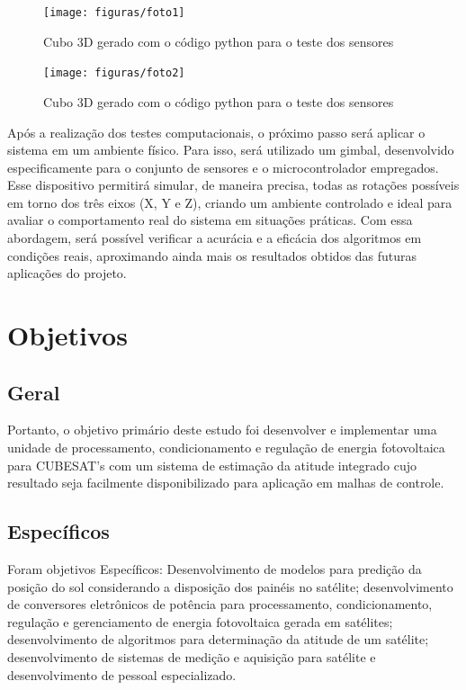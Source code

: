 \documentclass[
	12pt,				%
	openright,			%
	oneside,			%
	a4paper,			%
	english,			%
	brazil				%
	]{abntex2}
\begin{document}
\begin{figure}[h]
	\centering
	\texttt{[image: figuras/foto1]}
	\caption{Cubo 3D gerado com o código python para o teste dos sensores}
	\label{fig:Imagemcubo1}
\end{figure}

\begin{figure}[h]
	\centering
	\texttt{[image: figuras/foto2]}
	\caption{Cubo 3D gerado com o código python para o teste dos sensores}
	\label{fig:Imagemcubo2}
\end{figure}


Após a realização dos testes computacionais, o próximo passo será aplicar o sistema em um ambiente físico. Para isso, será utilizado um gimbal, desenvolvido especificamente para o conjunto de sensores e o microcontrolador empregados. Esse dispositivo permitirá simular, de maneira precisa, todas as rotações possíveis em torno dos três eixos (X, Y e Z), criando um ambiente controlado e ideal para avaliar o comportamento real do sistema em situações práticas. Com essa abordagem, será possível verificar a acurácia e a eficácia dos algoritmos em condições reais, aproximando ainda mais os resultados obtidos das futuras aplicações do projeto.


\section{Objetivos}

\subsection*{Geral}

Portanto, o objetivo primário deste estudo foi desenvolver e implementar uma unidade de processamento, condicionamento e regulação de energia fotovoltaica para CUBESAT’s com um sistema de estimação da atitude integrado cujo resultado seja facilmente disponibilizado para aplicação em malhas de controle.
%
\subsection*{Específicos}

 Foram objetivos Específicos: Desenvolvimento de modelos para predição da posição do sol considerando a disposição dos painéis no satélite; desenvolvimento de conversores eletrônicos de potência para processamento, condicionamento, regulação e gerenciamento de energia fotovoltaica gerada em satélites; desenvolvimento de algoritmos para determinação da atitude de um satélite; desenvolvimento de sistemas de medição e aquisição para satélite e desenvolvimento de pessoal especializado.
%
\end{document}
